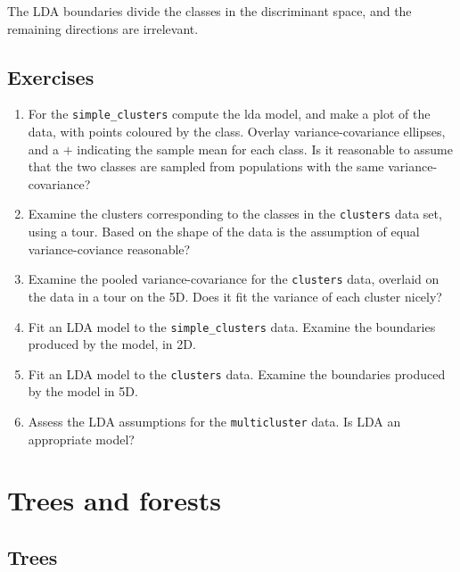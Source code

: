 \documentclass[
  letterpaper,
]{book}
\providecommand{\tightlist}{%
  \setlength{\itemsep}{0pt}\setlength{\parskip}{0pt}}\usepackage{longtable,booktabs,array}
\begin{document}
The LDA boundaries divide the classes in the discriminant space, and the
remaining directions are irrelevant.

\hypertarget{exercises-11}{%
\section*{Exercises}\label{exercises-11}}


\begin{enumerate}
\def\labelenumi{\arabic{enumi}.}
\tightlist
\item
  For the \texttt{simple\_clusters} compute the lda model, and make a
  plot of the data, with points coloured by the class. Overlay
  variance-covariance ellipses, and a \(+\) indicating the sample mean
  for each class. Is it reasonable to assume that the two classes are
  sampled from populations with the same variance-covariance?
\item
  Examine the clusters corresponding to the classes in the
  \texttt{clusters} data set, using a tour. Based on the shape of the
  data is the assumption of equal variance-coviance reasonable?
\item
  Examine the pooled variance-covariance for the \texttt{clusters} data,
  overlaid on the data in a tour on the 5D. Does it fit the variance of
  each cluster nicely?
\item
  Fit an LDA model to the \texttt{simple\_clusters} data. Examine the
  boundaries produced by the model, in 2D.
\item
  Fit an LDA model to the \texttt{clusters} data. Examine the boundaries
  produced by the model in 5D.
\item
  Assess the LDA assumptions for the \texttt{multicluster} data. Is LDA
  an appropriate model?
\end{enumerate}

\hypertarget{sec-trees-forests}{%
\chapter{Trees and forests}\label{sec-trees-forests}}

\hypertarget{sec-trees}{%
\section{Trees}\label{sec-trees}}
\end{document}
